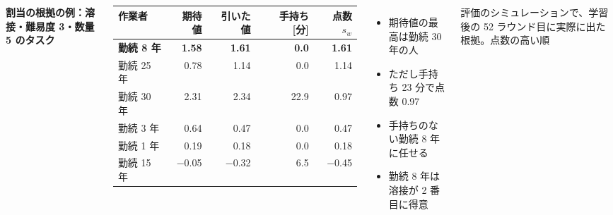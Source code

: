 \documentclass[17pt,a1paper,portrait,margin=0mm,innermargin=14mm,
  blockverticalspace=4mm,colspace=11mm,subcolspace=8mm]{tikzposter}
\newcommand{\capt}[1]{{\centering\fontsize{14pt}{18pt}\selectfont\color{ink2}#1\par}}
\newcommand{\head}[1]{{\bfseries\color{navy}#1}\par}
\begin{document}
\begin{columns}
{  %
  \head{割当の根拠の例：溶接・難易度 3・数量 5 のタスク}
  \begin{minipage}[c]{0.52\linewidth}
    {\centering\fontsize{16pt}{21pt}\selectfont
    \newcommand{\hl}[1]{\textcolor{accent}{\textbf{#1}}}
    \begin{tabular}{lrrrr}
      \toprule
      作業者 & 期待値 & 引いた値 & 手持ち [分] & 点数 $s_w$ \\
      \midrule
      \hl{勤続\hspace{0.5em} 8 年}  & \hl{1.58} & \hl{1.61} & \hl{0.0}    & \hl{1.61} \\
      勤続 25 年 & 0.78  & 1.14  & 0.0    & 1.14 \\
      勤続 30 年 & 2.31  & 2.34  & 22.9 & 0.97 \\
      勤続 \hspace{0.5em}3 年  & 0.64  & 0.47  & 0.0    & 0.47 \\
      勤続 \hspace{0.5em}1 年  & 0.19  & 0.18  & 0.0    & 0.18 \\
      勤続 15 年 & −0.05 & −0.32 & 6.5  & −0.45 \\
      \bottomrule
    \end{tabular}\par}
  \end{minipage}\hfill
  \begin{minipage}[c]{0.46\linewidth}
    \begin{itemize}
      \item 期待値の最高は勤続 30 年の人
      \item ただし手持ち 23 分で点数 0.97
      \item 手持ちのない勤続 8 年に任せる
      \item 勤続 8 年は溶接が 2 番目に得意
    \end{itemize}
  \end{minipage}\par
  \vspace{4pt}
  \capt{評価のシミュレーションで、学習後の 52 ラウンド目に実際に出た根拠。点数の高い順}
}

\end{columns}
\end{document}
